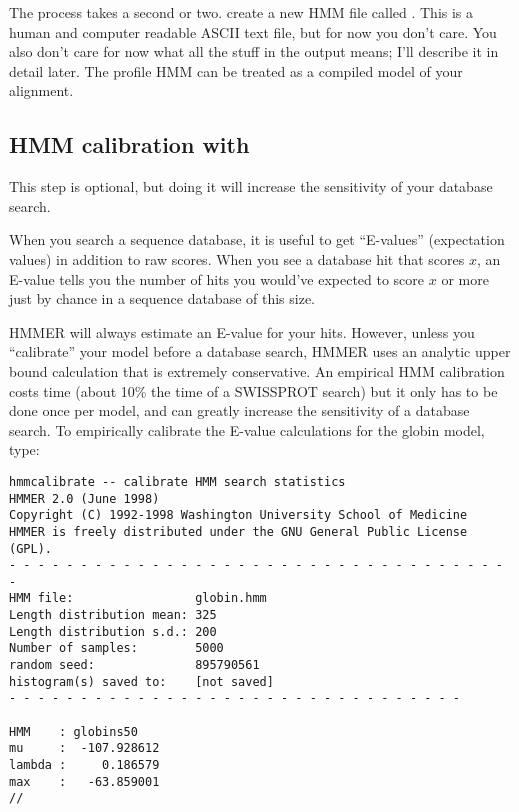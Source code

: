 The process takes a second or two.   create a new HMM
file called . This is a human and computer readable
ASCII text file, but for now you don't care. You also don't care for
now what all the stuff in the output means; I'll describe it in detail
later. The profile HMM can be treated as a compiled model of your
alignment.

\subsection{HMM calibration with }

This step is optional, but doing it will increase the sensitivity of
your database search.

When you search a sequence database, it is useful to get ``E-values''
(expectation values) in addition to raw scores. When you see a
database hit that scores $x$, an E-value tells you the number of hits
you would've expected to score $x$ or more just by chance in a
sequence database of this size. 

HMMER will always estimate an E-value for your hits. However, unless
you ``calibrate'' your model before a database search, HMMER uses an
analytic upper bound calculation that is extremely conservative.  An
empirical HMM calibration costs time (about 10\% the time of a
SWISSPROT search) but it only has to be done once per model, and can
greatly increase the sensitivity of a database search. To empirically
calibrate the E-value calculations for the globin model, type:

\vspace{1.5em}
\vspace{-1.5em}
{\small\begin{verbatim}
hmmcalibrate -- calibrate HMM search statistics
HMMER 2.0 (June 1998)
Copyright (C) 1992-1998 Washington University School of Medicine
HMMER is freely distributed under the GNU General Public License (GPL).
- - - - - - - - - - - - - - - - - - - - - - - - - - - - - - - - - - - -
HMM file:                 globin.hmm
Length distribution mean: 325
Length distribution s.d.: 200
Number of samples:        5000
random seed:              895790561
histogram(s) saved to:    [not saved]
- - - - - - - - - - - - - - - - - - - - - - - - - - - - - - - -

HMM    : globins50
mu     :  -107.928612
lambda :     0.186579
max    :   -63.859001
//
\end{verbatim}}

